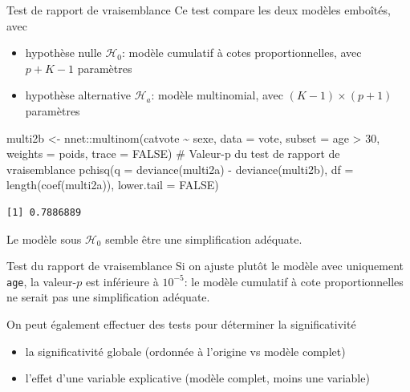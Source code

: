 \documentclass[
  ignorenonframetext,
]{beamer}
\newenvironment{Shaded}{\begin{snugshade}}{\end{snugshade}}
\newcommand{\AttributeTok}[1]{\textcolor[rgb]{0.40,0.45,0.13}{#1}}
\newcommand{\CommentTok}[1]{\textcolor[rgb]{0.37,0.37,0.37}{#1}}
\newcommand{\ConstantTok}[1]{\textcolor[rgb]{0.56,0.35,0.01}{#1}}
\newcommand{\DecValTok}[1]{\textcolor[rgb]{0.68,0.00,0.00}{#1}}
\newcommand{\FunctionTok}[1]{\textcolor[rgb]{0.28,0.35,0.67}{#1}}
\newcommand{\NormalTok}[1]{\textcolor[rgb]{0.00,0.23,0.31}{#1}}
\newcommand{\OtherTok}[1]{\textcolor[rgb]{0.00,0.23,0.31}{#1}}
\newcommand{\SpecialCharTok}[1]{\textcolor[rgb]{0.37,0.37,0.37}{#1}}
\providecommand{\tightlist}{%
  \setlength{\itemsep}{0pt}\setlength{\parskip}{0pt}}\usepackage{longtable,booktabs,array}
\begin{document}
\begin{frame}[fragile]{Test de rapport de vraisemblance}
\protect\hypertarget{test-de-rapport-de-vraisemblance}{}
Ce test compare les deux modèles emboîtés, avec

\begin{itemize}
\tightlist
\item
  hypothèse nulle \(\mathscr{H}_0\): modèle cumulatif à cotes
  proportionnelles, avec \(p+K-1\) paramètres
\item
  hypothèse alternative \(\mathscr{H}_a\): modèle multinomial, avec
  \((K-1)\times(p+1)\) paramètres
\end{itemize}

\begin{Shaded}
\begin{Highlighting}[numbers=left,,]
\NormalTok{multi2b }\OtherTok{\textless{}{-}}\NormalTok{ nnet}\SpecialCharTok{::}\FunctionTok{multinom}\NormalTok{(catvote }\SpecialCharTok{\textasciitilde{}}\NormalTok{ sexe, }
  \AttributeTok{data =}\NormalTok{ vote,  }\AttributeTok{subset =}\NormalTok{ age }\SpecialCharTok{\textgreater{}} \DecValTok{30}\NormalTok{, }
  \AttributeTok{weights =}\NormalTok{ poids, }\AttributeTok{trace =} \ConstantTok{FALSE}\NormalTok{)}
\CommentTok{\# Valeur{-}p du test de rapport de vraisemblance}
\FunctionTok{pchisq}\NormalTok{(}\AttributeTok{q =} \FunctionTok{deviance}\NormalTok{(multi2a) }\SpecialCharTok{{-}} \FunctionTok{deviance}\NormalTok{(multi2b),}
       \AttributeTok{df =} \FunctionTok{length}\NormalTok{(}\FunctionTok{coef}\NormalTok{(multi2a)), }
       \AttributeTok{lower.tail =} \ConstantTok{FALSE}\NormalTok{)}
\end{Highlighting}
\end{Shaded}

\begin{verbatim}
[1] 0.7886889
\end{verbatim}

Le modèle sous \(\mathscr{H}_0\) semble être une simplification
adéquate.
\end{frame}

\begin{frame}[fragile]{Test du rapport de vraisemblance}
\protect\hypertarget{test-du-rapport-de-vraisemblance}{}
Si on ajuste plutôt le modèle avec uniquement \texttt{age}, la
valeur-\(p\) est inférieure à \(10^{-5}\): le modèle cumulatif à cote
proportionnelles ne serait pas une simplification adéquate.

On peut également effectuer des tests pour déterminer la significativité

\begin{itemize}
\tightlist
\item
  la significativité globale (ordonnée à l'origine vs modèle complet)
\item
  l'effet d'une variable explicative (modèle complet, moins une
  variable)
\end{itemize}
\end{frame}
\end{document}
